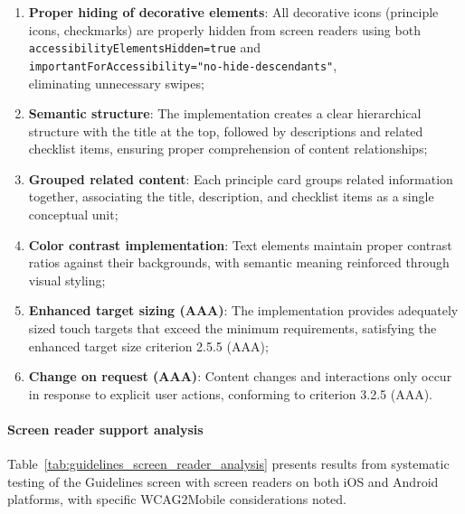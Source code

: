 \begin{enumerate}
    \item \textbf{Proper hiding of decorative elements}: All decorative icons (principle icons, checkmarks) are properly hidden from screen readers using both \\ \texttt{accessibilityElementsHidden=true} and \\ \texttt{importantForAccessibility="no-hide-descendants"}, \\ eliminating unnecessary swipes;
    
    \item \textbf{Semantic structure}: The implementation creates a clear hierarchical structure with the title at the top, followed by descriptions and related checklist items, ensuring proper comprehension of content relationships;
    
    \item \textbf{Grouped related content}: Each principle card groups related information together, associating the title, description, and checklist items as a single conceptual unit;
    
    \item \textbf{Color contrast implementation}: Text elements maintain proper contrast ratios against their backgrounds, with semantic meaning reinforced through visual styling;
    
    \item \textbf{Enhanced target sizing (AAA)}: The implementation provides adequately sized touch targets that exceed the minimum requirements, satisfying the enhanced target size criterion 2.5.5 (AAA);
    
    \item \textbf{Change on request (AAA)}: Content changes and interactions only occur in response to explicit user actions, conforming to criterion 3.2.5 (AAA).
\end{enumerate}

\paragraph{Screen reader support analysis}

Table~\ref{tab:guidelines_screen_reader_analysis} presents results from systematic testing of the Guidelines screen with screen readers on both iOS and Android platforms, with specific WCAG2Mobile considerations noted.


